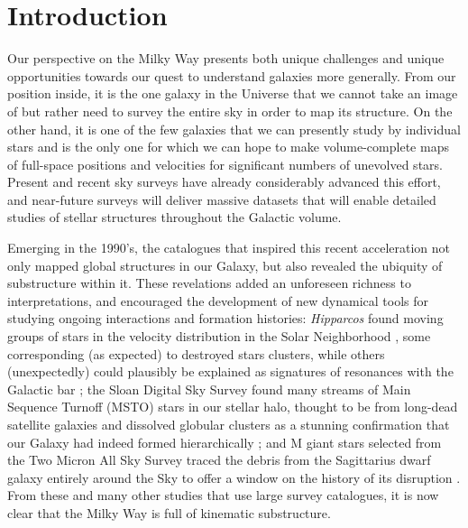 \documentclass[galaxies,article,submit,moreauthors,pdftex,10pt,a4paper]{mdpi}
\newcommand{\survey}[1]{\textsl{#1}}
\begin{document}


\section{Introduction}

Our perspective on the Milky Way presents both unique challenges and unique opportunities towards our quest to understand galaxies more generally.
From our position inside, it is the one galaxy in the Universe that we cannot take an image of but rather need to survey the entire sky in order to map its structure.
On the other hand, it is one of the few galaxies that we can presently study by individual stars and is the only one for which we can hope to make volume-complete maps of full-space positions and velocities for significant numbers of unevolved stars.
Present and recent sky surveys have already considerably advanced this effort, and near-future surveys will deliver massive datasets that will enable detailed studies of stellar structures throughout the Galactic volume.


Emerging in the 1990's, the catalogues that inspired this recent acceleration not only mapped global structures in our Galaxy, but also revealed the ubiquity of substructure within it.
These revelations added an unforeseen richness to interpretations, and encouraged the development of new dynamical tools for studying ongoing interactions and formation histories:
\survey{Hipparcos} \cite{esa97} found moving groups of stars in the velocity distribution in the Solar Neighborhood \cite{dehnen98}, some corresponding (as expected) to destroyed stars clusters, while others (unexpectedly) could plausibly be explained as signatures of resonances with the Galactic bar \cite{dehnen00};
the Sloan Digital Sky Survey \cite[hereafter, SDSS ---][]{york00,stoughton02,abazajian03} found many streams of Main Sequence Turnoff (MSTO) stars in our stellar halo, thought to be from long-dead satellite galaxies and dissolved globular clusters \cite{newberg02,belokurov06} as a stunning confirmation that our Galaxy had indeed formed hierarchically \cite[e.g.][]{bullock01,bullock05};
and M giant stars selected from the Two Micron All Sky Survey \cite[hereafter, 2MASS ---][]{nikolaev00} traced the debris from the Sagittarius dwarf galaxy entirely around the Sky \cite{majewski03} to offer a window on the history of its disruption \cite{law10}.
From these and many other studies that use large survey catalogues, it is now clear that the Milky Way is full of kinematic substructure.
\end{document}
